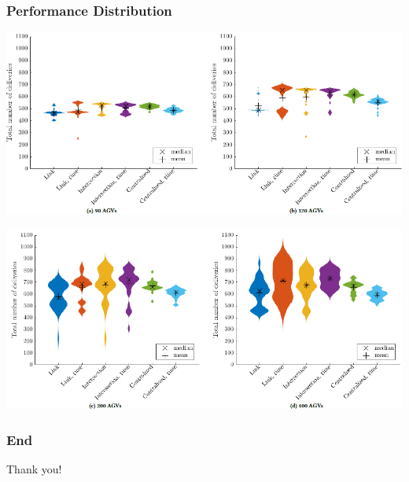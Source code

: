 \documentclass{beamer}
\begin{document}
	\begin{frame}
	\frametitle{Performance Distribution}
	\begin{center}
    \includegraphics[height=0.425\textheight ]{violin1.png}
    
    
     \includegraphics[height=0.425\textheight]{violin2.png}
     \end{center}
	\end{frame}
	
	\begin{frame}
	\frametitle{End}
    Thank you!
	\end{frame}
\end{document}
